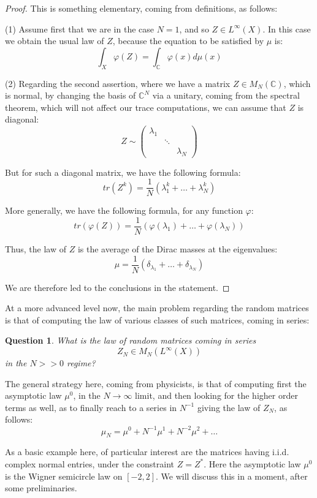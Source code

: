\documentclass[12pt]{amsbook}
\newtheorem{question}[theorem]{Question}
\begin{document}
\begin{proof}
This is something elementary, coming from definitions, as follows:

\medskip

(1) Assume first that we are in the case $N=1$, and so $Z\in L^\infty(X)$. In this case we obtain the usual law of $Z$, because the equation to be satisfied by $\mu$ is:
$$\int_X\varphi(Z)=\int_\mathbb C\varphi(x)d\mu(x)$$

(2) Regarding the second assertion, where we have a matrix $Z\in M_N(\mathbb C)$, which is normal, by changing the basis of $\mathbb C^N$ via a unitary, coming from the spectral theorem, which will not affect our trace computations, we can assume that $Z$ is diagonal:
$$Z\sim
\begin{pmatrix}
\lambda_1\\
&\ddots\\
&&\lambda_N
\end{pmatrix}$$

But for such a diagonal matrix, we have the following formula:
$$tr(Z^k)=\frac{1}{N}(\lambda_1^k+\ldots+\lambda_N^k)$$

More generally, we have the following formula, for any function $\varphi$:
$$tr(\varphi(Z))=\frac{1}{N}(\varphi(\lambda_1)+\ldots+\varphi(\lambda_N))$$

Thus, the law of $Z$ is the average of the Dirac masses at the eigenvalues:
$$\mu=\frac{1}{N}\left(\delta_{\lambda_1}+\ldots+\delta_{\lambda_N}\right)$$

We are therefore led to the conclusions in the statement.
\end{proof}

At a more advanced level now, the main problem regarding the random matrices is that of computing the law of various classes of such matrices, coming in series:

\begin{question}
What is the law of random matrices coming in series
$$Z_N\in M_N(L^\infty(X))$$
in the $N>>0$ regime?
\end{question}

The general strategy here, coming from physicists, is that of computing first the asymptotic law $\mu^0$, in the $N\to\infty$ limit, and then looking for the higher order terms as well, as to finally reach to a series in $N^{-1}$ giving the law of $Z_N$, as follows: 
$$\mu_N=\mu^0+N^{-1}\mu^1+N^{-2}\mu^2+\ldots$$

As a basic example here, of particular interest are the matrices having i.i.d. complex normal entries, under the constraint $Z=Z^*$. Here the asymptotic law $\mu^0$ is the Wigner semicircle law on $[-2,2]$. We will discuss this in a moment, after some preliminaries.
\end{document}

